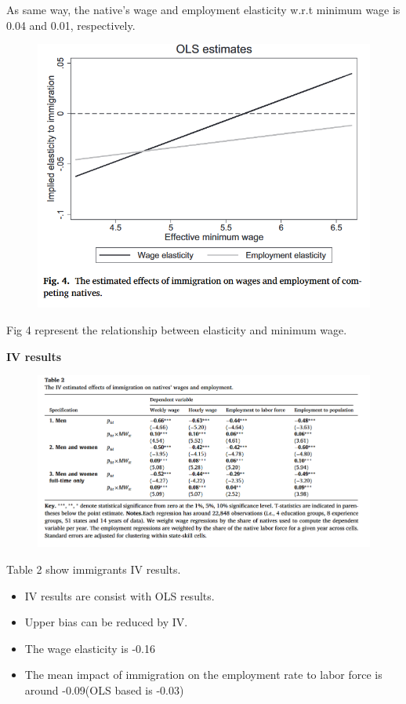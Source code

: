 \documentclass[../root]{subfiles}
\begin{document}
    As same way, the native's wage and employment elasticity w.r.t minimum wage is 0.04 and 0.01, respectively.
    
    
    \begin{figure}[h]
        \includegraphics [width=12cm]{0612sugiyama/figure4.png}
    \end{figure}

    Fig 4 represent the relationship between elasticity and minimum wage.

    {\bf IV results} \\

    \begin{figure}[h]
        \includegraphics[width=12cm]{0612sugiyama/table2.png}
    \end{figure}

    Table 2 show immigrants IV results.

    \begin{itemize}
        \item IV results are consist with OLS results.
        \item Upper bias can be reduced by IV.
        \item The wage elasticity is -0.16
        \item The mean impact of immigration on the employment rate to labor force is around -0.09(OLS based is -0.03)
    \end{itemize}
    
\end{document}
